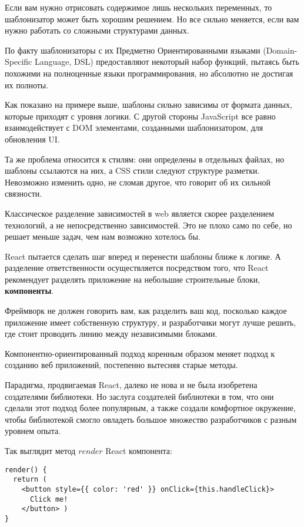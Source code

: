 Если вам нужно отрисовать содержимое лишь нескольких переменных, то шаблонизатор может быть хорошим решением. Но все сильно меняется, если вам нужно работать со сложными структурами данных.

По факту шаблонизаторы с их Предметно Ориентированными языками (Domain-Specific Language, DSL) предоставляют некоторый набор функций, пытаясь быть похожими на полноценные языки программирования, но абсолютно не достигая их полноты.

Как показано на примере выше, шаблоны сильно зависимы от формата данных, которые приходят с уровня логики. С другой стороны JavaScript все равно взаимодействует с DOM элементами, созданными шаблонизатором, для обновления UI. 

Та же проблема относится к стилям: они определены в отдельных файлах, но шаблоны ссылаются на них, а CSS стили следуют структуре разметки. Невозможно изменить одно, не сломав другое, что говорит об их сильной связности.

Классическое разделение зависимостей в web является скорее разделением технологий, а не непосредственно зависимостей. Это не плохо само по себе, но решает меньше задач, чем нам возможно хотелось бы.

React пытается сделать шаг вперед и перенести шаблоны ближе к логике. А разделение ответственности осуществляется посредством того, что React рекомендует разделять приложение на небольшие строительные блоки, \textbf{компоненты}.

Фреймворк не должен говорить вам, как разделить ваш код, посколько каждое приложение имеет собственную структуру, и разработчики могут лучше решить, где стоит проводить линию между независимыми блоками.

Компонентно-ориентированный подход коренным образом меняет подход к созданию веб приложений, постепенно вытесняя старые методы.

Парадигма, продвигаемая React, далеко не нова и не была изобретена создателями библиотеки. Но заслуга создателей библиотеки в том, что они сделали этот подход более популярным, а также создали комфортное окружение, чтобы библиотекой смогло овладеть большое множество разработчиков с разным уровнем опыта.

Так выглядит метод $render$ React компонента:

\begin{lstlisting}
render() {
  return (
    <button style={{ color: 'red' }} onClick={this.handleClick}>
      Click me!
    </button> )
}
\end{lstlisting}

